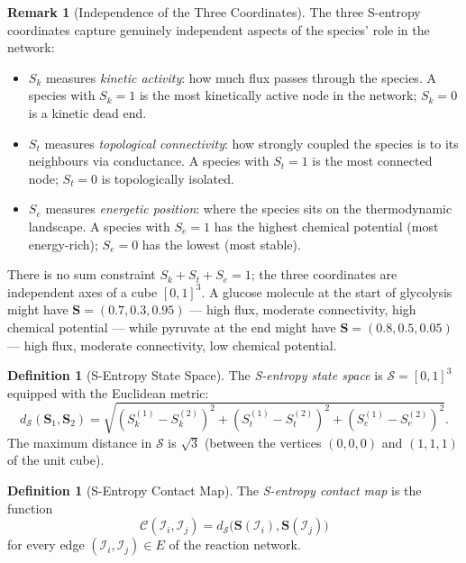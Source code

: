 \documentclass[11pt,twocolumn]{article}
\theoremstyle{plain}
\theoremstyle{definition}
\newtheorem{definition}[theorem]{Definition}
\newtheorem{remark}[theorem]{Remark}
\newcommand{\CC}{\mathcal{C}}
\newcommand{\Sk}{S_k}
\newcommand{\St}{S_t}
\newcommand{\Se}{S_e}
\newcommand{\bS}{\mathbf{S}}
\newcommand{\dS}{d_{\mathcal{S}}}
\begin{document}
\begin{remark}[Independence of the Three Coordinates]
\label{rem:independence}
The three S-entropy coordinates capture genuinely independent aspects of the
species' role in the network:
\begin{itemize}
\item $\Sk$ measures \emph{kinetic activity}: how much flux passes through the
  species. A species with $\Sk = 1$ is the most kinetically active node in the
  network; $\Sk = 0$ is a kinetic dead end.
\item $\St$ measures \emph{topological connectivity}: how strongly coupled the
  species is to its neighbours via conductance. A species with $\St = 1$ is the
  most connected node; $\St = 0$ is topologically isolated.
\item $\Se$ measures \emph{energetic position}: where the species sits on the
  thermodynamic landscape. A species with $\Se = 1$ has the highest chemical
  potential (most energy-rich); $\Se = 0$ has the lowest (most stable).
\end{itemize}
There is no sum constraint $\Sk + \St + \Se = 1$; the three coordinates are
independent axes of a cube $[0,1]^3$. A glucose molecule at the start of
glycolysis might have $\bS = (0.7, 0.3, 0.95)$ --- high flux, moderate
connectivity, high chemical potential --- while pyruvate at the end might have
$\bS = (0.8, 0.5, 0.05)$ --- high flux, moderate connectivity, low chemical
potential.
\end{remark}

\begin{definition}[S-Entropy State Space]
\label{def:state_space}
The \emph{S-entropy state space} is $\mathcal{S} = [0,1]^3$ equipped with the
Euclidean metric:
\begin{equation}\label{eq:dS}
  \dS(\bS_1, \bS_2)
  = \sqrt{(\Sk^{(1)} - \Sk^{(2)})^2
        + (\St^{(1)} - \St^{(2)})^2
        + (\Se^{(1)} - \Se^{(2)})^2}.
\end{equation}
The maximum distance in $\mathcal{S}$ is $\sqrt{3}$ (between the vertices
$(0,0,0)$ and $(1,1,1)$ of the unit cube).
\end{definition}

\begin{definition}[S-Entropy Contact Map]
\label{def:sentropy_contact_map}
The \emph{S-entropy contact map} is the function
\begin{equation}\label{eq:CM}
  \CC(\mathcal{I}_i, \mathcal{I}_j)
  = \dS\bigl(\bS(\mathcal{I}_i), \bS(\mathcal{I}_j)\bigr)
\end{equation}
for every edge $(\mathcal{I}_i, \mathcal{I}_j) \in E$ of the reaction network.
\end{definition}
\end{document}
